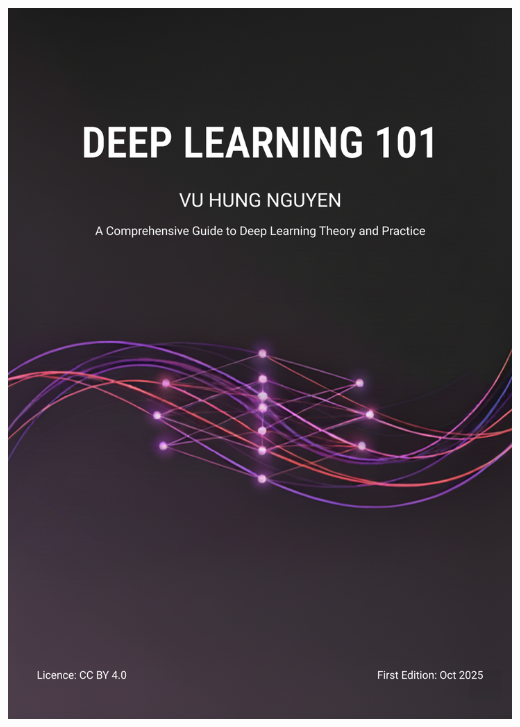 \documentclass[10pt,\papersize,twoside,openright]{book}
\begin{document}
{{{{{{            \includegraphics[width=\paperwidth,height=\paperheight]{images/DeepLearning101-cover-A6.png}%
          }{%
            }}}}}}
\end{document}
